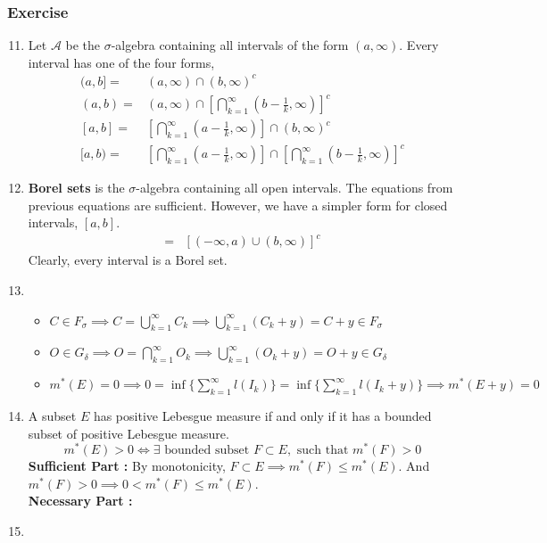 \subsubsection{Exercise}
\begin{enumerate}
	\setcounter{enumi}{10}
	\item Let $\mathcal{A}$ be the $\sigma$-algebra containing all intervals of the form $(a, \infty)$.
		Every interval has one of the four forms,
	\begin{align}
		(a,b] = & (a,\infty) \cap (b,\infty)^c \\
		(a,b) = & (a,\infty) \cap \left[\bigcap_{k=1}^\infty \left(b-\frac{1}{k},\infty\right)\right]^c \\
		[a,b] = & \left[ \bigcap_{k=1}^\infty \left(a-\frac{1}{k},\infty\right)\right] \cap (b,\infty)^c \\
		[a,b) = & \left[\bigcap_{k=1}^\infty \left(a-\frac{1}{k},\infty\right)\right] \cap \left[ \bigcap_{k=1}^\infty \left(b-\frac{1}{k},\infty\right)\right]^c
	\end{align}
\item \textbf{Borel sets} is the $\sigma$-algebra containing all open intervals.
	The equations from previous equations are sufficient.
	However, we have a simpler form for closed intervals, $[a,b]$.
	\begin{align}
		[a,b] = & \left[(-\infty,a) \cup (b,\infty) \right]^c 
	\end{align}
		Clearly, every interval is a Borel set.
	\item
	\begin{itemize}
		\item $C \in F_\sigma \implies C = \bigcup_{k=1}^\infty C_k \implies \bigcup_{k=1}^\infty \left(C_k+y\right) = C+y \in F_\sigma$
		\item $O \in G_\delta \implies O = \bigcap_{k=1}^\infty O_k \implies \bigcup_{k=1}^\infty \left( O_k+y \right) =  O+y \in G_\delta$
		\item $m^\ast(E) = 0 \implies 0 = \inf\{\sum_{k=1}^\infty l(I_k)\} = \inf\{\sum_{k=1}^\infty l(I_k+y)\} \implies  m^\ast(E+y) = 0$
	\end{itemize}
	\item A subset $E$ has positive Lebesgue measure if and only if it has a bounded subset of positive Lebesgue measure.
		\[ m^\ast(E) > 0 \iff \exists \text{ bounded subset }F \subset E,\text{ such that } m^\ast(F) > 0 \]
		\textbf{Sufficient Part :} By monotonicity, $F \subset E \implies m^\ast(F) \le m^\ast(E)$.
		And $m^\ast(F) > 0 \implies 0 < m^\ast(F) \le m^\ast(E)$.\\
		\textbf{Necessary Part :}
	\item 
\end{enumerate}

